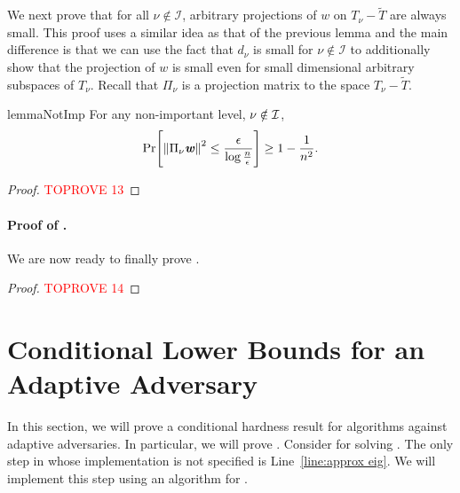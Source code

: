 \documentclass[11pt]{article}
\renewcommand{\norm}[1]{\ensuremath{\left\lVert #1 \right\rVert}}
\let\originalleft\left
\let\originalright\right
\renewcommand{\left}{\mathopen{}\mathclose\bgroup\originalleft}
\renewcommand{\right}{\aftergroup\egroup\originalright}
\newcommand\ww{\boldsymbol{\mathit{w}}}
\newcommand\Ttil{{\tilde{\mathit{T}}}}
\begin{document}
We next prove that for all $\nu\notin \mathcal{I}$, arbitrary projections of $\ww$ on $T_{\nu}-\Ttil$ are always small. This proof uses a similar idea as that of the previous lemma and the main difference is that we can use the fact that $d_{\nu}$ is small for $\nu\notin \mathcal{I}$ to additionally show that the projection of $\ww$ is small even for small dimensional arbitrary subspaces of $T_{\nu}$. Recall that $\Pi_\nu$ is a projection matrix to the space $T_{\nu}-\Ttil$.
\begin{restatable}{lemma}{NotImp}\label{lem:NotImp}
For any non-important level, $\nu \notin \cal{I}$,
\[
\Pr\left[\norm{\Pi_{\nu}\ww}^2 \leq \frac{\epsilon}{\log\frac{n}{\epsilon}} \right] \geq 1-\frac{1}{n^{2}}.
\]
\end{restatable}

\begin{proof}\textcolor{red}{TOPROVE 13}\end{proof}


\paragraph{Proof of .}
 We are now ready to finally prove .

\begin{proof}\textcolor{red}{TOPROVE 14}\end{proof}

 
\section{Conditional Lower Bounds for an Adaptive Adversary}\label{sec:Adap}

In this section, we will prove a conditional hardness result for algorithms against adaptive adversaries. In particular, we will prove .
Consider  for solving . 
The only step in  whose implementation is not specified is Line~\ref{line:approx eig}. We will implement this step using an algorithm for .
\end{document}
